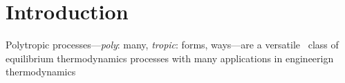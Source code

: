 \section{Introduction}

    Polytropic processes---\emph{poly}: many, \emph{tropic}: forms, ways---are a
    versatile~\cite{2020-NaaktgeborenC-engrXiv} class of equilibrium thermodynamics processes
    with many applications in engineerign thermodynamics~\cite{}


